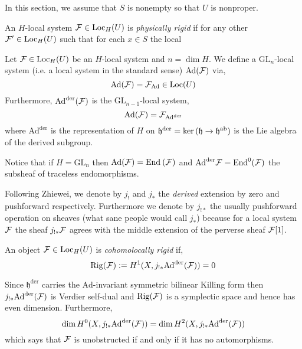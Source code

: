 \documentclass[12pt]{article}
\begin{document}
\begin{rmk}
In this section, we assume that $S$ is nonempty so that $U$ is nonproper. 
\end{rmk}

\begin{defn}
An $H$-local system $\mathcal{F} \in \mathrm{Loc}_H(U)$ is \textit{physically rigid} if for any other $\mathcal{F}' \in \mathrm{Loc}_H(U)$ such that for each $x \in S$ the local 
\end{defn}

\newcommand{\Rig}{\mathrm{Rig}}
\newcommand{\Ad}{\mathrm{Ad}}
\newcommand{\der}{\mathrm{der}}
\renewcommand{\GL}{\mathrm{GL}}
\newcommand{\h}{\mathfrak{h}}

\begin{defn}
Let $\mathcal{F} \in \mathrm{Loc}_H(U)$ be an $H$-local system and $n = \dim{H}$. We define a $\GL_n$-local system (i.e. a local system in the standard sense) $\Ad(\F)$ via,
\[ \Ad(\F) = \F_{\Ad} \in \Loc(U) \]
Furthermore, $\Ad^\der(\F)$ is the $\GL_{n-1}$-local system,
\[ \Ad(\F) = \F_{\Ad^\der} \]
where $\Ad^\der$ is the representation of $H$ on $\h^\der = \ker{(\h \to \h^\ab)}$ is the Lie algebra of the derived subgroup.
\end{defn}

\begin{rmk}
Notice that if $H = \GL_n$ then $\Ad(\F) = \End{\F}$ and $\Ad^\der{\F} = \mathrm{End}^0(\F)$ the subsheaf of traceless endomorphisms.
\end{rmk}

\begin{rmk}
Following Zhiewei, we denote by $j_!$ and $j_*$ the \textit{derived} extension by zero and pushforward respectively. Furthermore we denote by $j_{!*}$ the usually pushforward operation on sheaves (what sane people would call $j_*$) because for a local system $\mathcal{F}$ the sheaf $j_{!*} \mathcal{F}$ agrees with the middle extension of the perverse sheaf $\mathcal{F}[1]$. 
\end{rmk}

\begin{defn}
An object $\mathcal{F} \in \mathrm{Loc}_H(U)$ is \textit{cohomolocally rigid} if,
\[ \Rig(\F) := H^1(X, j_{!*} \Ad^\der(\F)) = 0 \]
\end{defn}

\begin{rmk}
Since $\h^\der$ carries the $\Ad$-invariant symmetric bilinear Killing form then $j_{!*} \Ad^\der(\F)$ is Verdier self-dual and $\Rig(\F)$ is a symplectic space and hence has even dimension. Furthermore,
\[ \dim{H^0(X, j_{!*} \Ad^\der(\F))} = \dim{H^2(X, j_{!*} \Ad^\der(\F))} \]
which says that $\mathcal{F}$ is unobstructed if and only if it has no automorphisms.  
\end{rmk}
\end{document}
